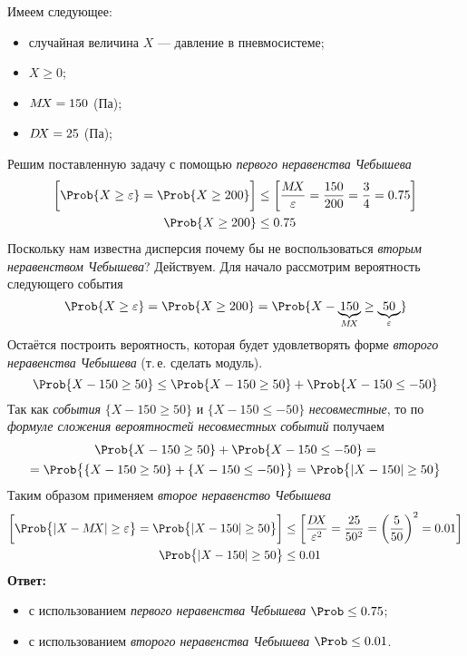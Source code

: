 \begin{slv}
	Имеем следующее:
	\begin{itemize}
		\item случайная величина $X$ --- давление в пневмосистеме;
		\item $X \geq 0$;
		\item $M\!X = 150$ (Па);
		\item $D\!X = 25$ (Па);
	\end{itemize}
	Решим поставленную задачу с помощью \emph{первого неравенства Чебышева}
	\begin{align*}
		\biggl[\Prob\{ X \geq \varepsilon \} = \Prob\{ X \geq 200 \}\biggr] &\leq \biggl[\frac{\mx}{\varepsilon} = \frac{150}{200} = \frac{3}{4} = 0.75\biggr] 
		\\
		\Prob\{ X \geq 200 \} &\leq 0.75
	\end{align*}
	Поскольку нам известна дисперсия почему бы не воспользоваться \emph{вторым неравенством Чебышева}? Действуем. Для начало рассмотрим вероятность следующего события 
	\[
		\Prob\{ X \geq \varepsilon \} = \Prob\{ X \geq 200 \} = \Prob\{ X - \underbrace{150}_{\mx} \geq \underbrace{50}_\varepsilon \}
	\]
	Остаётся построить вероятность, которая будет удовлетворять форме \emph{второго неравенства Чебышева} (т.\,е. сделать модуль).
	\[
		 \Prob\{ X - 150 \geq 50 \} \leq \Prob\{ X - 150 \geq 50 \} + \Prob\{ X - 150 \leq -50 \}
	\]
	Так как \emph{события} $\{ X - 150 \geq 50 \}$ и $\{ X - 150 \leq -50 \}$ \emph{несовместные}, то по \emph{формуле сложения вероятностей несовместных событий} получаем
	\begin{multline*}
		\Prob\{ X - 150 \geq 50 \} + \Prob\{ X - 150 \leq -50 \} = \\
		= \Prob\bigl\{ \{ X - 150 \geq 50 \} + \{ X - 150 \leq -50 \} \bigr\} = \Prob\bigl\{ |X - 150| \geq 50 \bigr\}
	\end{multline*}
	Таким образом применяем \emph{второе неравенство Чебышева}
	\begin{align*}
		\biggl[\Prob\bigl\{ |X - \mx|\geq\varepsilon \bigr\} = \Prob\bigl\{ |X - 150| \geq 50 \bigr\}\biggr] &\leq \biggl[\frac{\dx}{\varepsilon^2} = \frac{25}{50^2} = \biggl(\frac{5}{50}\biggr)^2 = 0.01\biggr]
		\\
		\Prob\bigl\{ |X - 150| \geq 50 \bigr\} &\leq 0.01
	\end{align*}
	\textbf{Ответ:} \begin{itemize}
		\item с использованием \emph{первого неравенства Чебышева} $\Prob \leq 0.75$;
		\item с использованием \emph{второго неравенства Чебышева} $\Prob \leq 0.01$.
	\end{itemize}
\end{slv}

